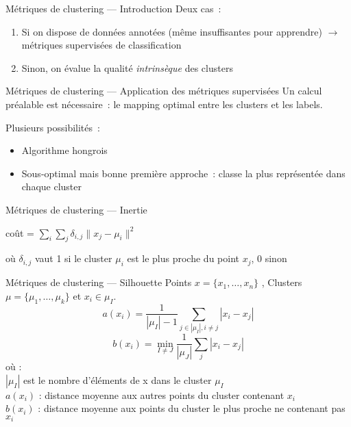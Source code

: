 \begin{frame}{Métriques de clustering --- Introduction}
  Deux cas~:

  \begin{enumerate}[<+->]
    \item Si on dispose de données annotées (même insuffisantes pour apprendre) $\rightarrow$ métriques supervisées de classification
    \item Sinon, on évalue la qualité \emph{intrinsèque} des clusters
  \end{enumerate}

\end{frame}

\begin{frame}{Métriques de clustering --- Application des métriques supervisées}
  Un calcul préalable est nécessaire~: le mapping optimal entre les clusters et les labels.

  Plusieurs possibilités~:

  \begin{itemize}[<+->]
    \item Algorithme hongrois
    \item Sous-optimal mais bonne première approche~: classe la plus représentée dans chaque cluster
  \end{itemize}
\end{frame}

\begin{frame}{Métriques de clustering --- Inertie}
  \begin{center}
    coût = $\sum_i \sum_j \delta_{i,j}\lVert x_j - \mu_i \rVert^2$
  \end{center}
  où $\delta_{i,j}$ vaut 1 si le cluster $\mu_i$ est le plus proche du point $x_j$, 0 sinon
\end{frame}

\begin{frame}{Métriques de clustering --- Silhouette}
  Points $x = \{x_1, \dotsc, x_n\}$ , Clusters $\mu = \{\mu_1, \dotsc, \mu_k\}$ et $x_i\in\mu_I$. \\
  \[
  \boxed{a(x_i) = \frac{1}{|\mu_I|-1}\sum_{j\in|\mu_I|, i \neq j} |x_i - x_j|}
  \]
  \[
  \boxed{b(x_i) = \min_{I \neq J} \frac{1}{|\mu_J|}\sum_j |x_i - x_j|}
  \]
  où : \\
  $|\mu_I|$ est le nombre d'éléments de x dans le cluster $\mu_I$ \\
  $a(x_i)$ : distance moyenne aux autres points du cluster contenant $x_i$ \\
  $b(x_i)$ : distance moyenne aux points du cluster le plus proche ne contenant pas $x_i$
  
\end{frame}

